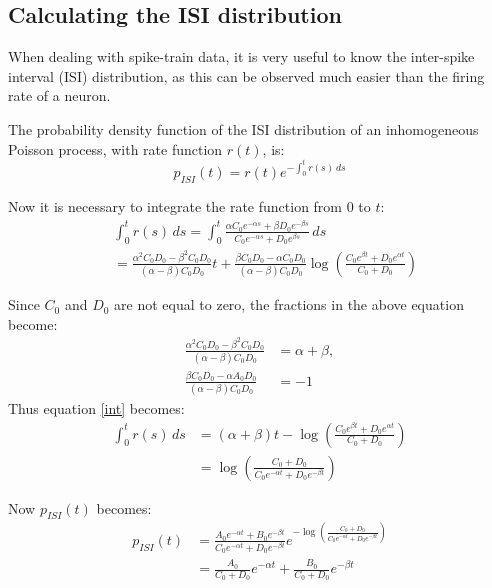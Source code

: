 \subsection{Calculating the ISI distribution}

When dealing with spike-train data, it is very useful to know the inter-spike interval (ISI) distribution, as this can be observed much easier than the firing rate of a neuron.

The probability density function of the ISI distribution of an inhomogeneous Poisson process, with rate function $r(t)$, is:
\begin{equation}
p_{ISI}(t) = r(t) e^{-\int_0^t r(s)\,ds}
\end{equation}

Now it is necessary to integrate the rate function from $0$ to $t$:
\begin{equation}
\begin{split}
\label{int}
&\int_0^t r(s)\,ds = \int_0^t  \frac{\alpha C_0e^{-\alpha s}+\beta D_0e^{-\beta s}}{C_0e^{-\alpha s} + D_0e^{\beta s}}\,ds\\ 
&= \frac{\alpha^2 C_0D_0 - \beta^2 C_0D_0}{(\alpha - \beta)C_0D_0}t + \frac{\beta C_0D_0-\alpha C_0D_0}{(\alpha - \beta)C_0D_0} \log\left({\frac{C_0e^{\beta t} + D_0e^{\alpha t}}{C_0 + D_0} }\right)
\end{split}
\end{equation}

Since $C_0$ and $D_0$ are not equal to zero, the fractions in the above equation become:
\begin{equation}
\begin{split}
\frac{\alpha^2 C_0D_0 - \beta^2 C_0D_0}{(\alpha - \beta)C_0D_0} & = \alpha+\beta,\\
 \frac{ \beta C_0D_0-\alpha A_0D_0}{(\alpha - \beta)C_0D_0} &= -1
\end{split}
\end{equation}
Thus equation \ref{int} becomes:
\begin{equation}
\begin{split}
\int_0^t r(s)\,ds &= (\alpha+\beta)t - \log\left( {\frac{C_0e^{\beta t} + D_0e^{\alpha t}}{C_0 + D_0} }\right) \\
&= \log \left( \frac{C_0+D_0}{C_0e^{-\alpha t}+D_0e^{-\beta t}}\right)
\end{split}
\end{equation}

Now $p_{ISI}(t)$ becomes:
\begin{equation}
\begin{split}
p_{ISI}(t) &= \frac{A_0e^{-\alpha t}+B_0e^{-\beta t}}{C_0e^{-\alpha t} + D_0e^{-\beta t}}e^{-\log \left( \frac{C_0+D_0}{C_0e^{-\alpha t}+D_0e^{-\beta t}}\right)}\\
&= \frac{A_0}{C_0+D_0}e^{-\alpha t} + \frac{B_0}{C_0+D_0}e^{-\beta t}
\end{split}
\end{equation}


